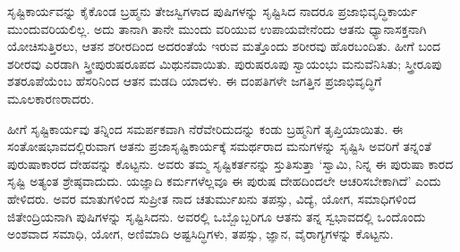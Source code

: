 ಸೃಷ್ಟಿಕಾರ್ಯವನ್ನು ಕೈಕೊಂಡ ಬ್ರಹ್ಮನು ತೇಜಸ್ವಿಗಳಾದ ಪುಷಿಗಳನ್ನು ಸೃಷ್ಟಿಸಿದ ನಾದರೂ ಪ್ರಜಾಭಿವೃದ್ಧಿಕಾರ್ಯ ಮುಂದುವರಿಯಲಿಲ್ಲ. ಅದು ತಾನಾಗಿ ತಾನೇ ಮುಂದು ವರಿಯುವ ಉಪಾಯವೇನೆಂದು ಆತನು ಧ್ಯಾನಾಸಕ್ತನಾಗಿ ಯೋಚಿಸುತ್ತಿರಲು, ಆತನ ಶರೀರದಿಂದ ಅದರಂತೆಯೆ ಇರುವ ಮತ್ತೊಂದು ಶರೀರವು ಹೊರಬಂದಿತು. ಹೀಗೆ ಬಂದ ಶರೀರವು ಎರಡಾಗಿ ಸ್ತ್ರೀಪುರುಷರೂಪದ ಮಿಥುನವಾಯಿತು. ಪುರುಷರೂಪು ಸ್ವಾಯಂಭು ಮನುವೆನಿಸಿತು; ಸ್ತ್ರೀರೂಪು ಶತರೂಪೆಯೆಂಬ ಹೆಸರಿನಿಂದ ಆತನ ಮಡದಿ ಯಾದಳು. ಈ ದಂಪತಿಗಳೇ ಜಗತ್ತಿನ ಪ್ರಜಾಭಿವೃದ್ಧಿಗೆ ಮೂಲಕಾರಣರಾದರು.

ಹೀಗೆ ಸೃಷ್ಟಿಕಾರ್ಯವು ತನ್ನಿಂದ ಸಮರ್ಪಕವಾಗಿ ನೆರೆವೇರಿದುದನ್ನು ಕಂಡು ಬ್ರಹ್ಮನಿಗೆ ತೃಪ್ತಿಯಾಯಿತು. ಈ ಸಂತೋಷಭಾವದಲ್ಲಿರುವಾಗ ಆತನು ಪ್ರಜಾಸೃಷ್ಟಿಕಾರ್ಯಕ್ಕೆ ಸಮರ್ಥರಾದ ಮನುಗಳನ್ನು ಸೃಷ್ಟಿಸಿ ಅವರಿಗೆ ತನ್ನಂತೆ ಪುರುಷಾಕಾರದ ದೇಹವನ್ನು ಕೊಟ್ಟನು. ಅವರು ತಮ್ಮ ಸೃಷ್ಟಿಕರ್ತನನ್ನು ಸ್ತುತಿಸುತ್ತಾ ‘ಸ್ವಾಮಿ, ನಿನ್ನ ಈ ಪುರುಷಾ ಕಾರದ ಸೃಷ್ಟಿ ಅತ್ಯಂತ ಶ್ರೇಷ್ಠವಾದುದು. ಯಜ್ಞಾದಿ ಕರ್ಮಗಳೆಲ್ಲವೂ ಈ ಪುರುಷ ದೇಹದಿಂದಲೇ ಆಚರಿಸಬೇಕಾಗಿದೆ’ ಎಂದು ಹೇಳಿದರು. ಅವರ ಮಾತುಗಳಿಂದ ಸುಪ್ರೀತ ನಾದ ಚತುರ್ಮುಖನು ತಪಸ್ಸು, ವಿದ್ಯೆ, ಯೋಗ, ಸಮಾಧಿಗಳಿಂದ ಜಿತೇಂದ್ರಿಯನಾಗಿ ಪುಷಿಗಳನ್ನು ಸೃಷ್ಟಿಸಿದನು. ಅವರಲ್ಲಿ ಒಬ್ಬೊಬ್ಬರಿಗೂ ಆತನು ತನ್ನ ಸ್ವಭಾವದಲ್ಲಿ ಒಂದೊಂದು ಅಂಶವಾದ ಸಮಾಧಿ, ಯೋಗ, ಅಣಿಮಾದಿ ಅಷ್ಟಸಿದ್ಧಿಗಳು, ತಪಸ್ಸು, ಜ್ಞಾನ, ವೈರಾಗ್ಯಗಳನ್ನು ಕೊಟ್ಟನು.

